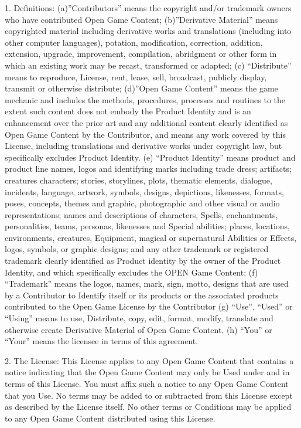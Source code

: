 \documentclass[letter,10pt,twocolumn,openany]{dndbook}
\begin{document}
1. Definitions: (a)”Contributors” means the copyright and/or trademark owners who have contributed Open Game Content; (b)”Derivative Material” means copyrighted material including derivative works and translations (including into other computer languages), potation, modification, correction, addition, extension, upgrade, improvement, compilation, abridgment or other form in which an existing work may be recast, transformed or adapted; (c) “Distribute” means to reproduce, License, rent, lease, sell, broadcast, publicly display, transmit or otherwise distribute; (d)”Open Game Content” means the game mechanic and includes the methods, procedures, processes and routines to the extent such content does not embody the Product Identity and is an enhancement over the prior art and any additional content clearly identified as Open Game Content by the Contributor, and means any work covered by this License, including translations and derivative works under copyright law, but specifically excludes Product Identity. (e) “Product Identity” means product and product line names, logos and identifying marks including trade dress; artifacts; creatures characters; stories, storylines, plots, thematic elements, dialogue, incidents, language, artwork, symbols, designs, depictions, likenesses, formats, poses, concepts, themes and graphic, photographic and other visual or audio representations; names and descriptions of characters, Spells, enchantments, personalities, teams, personas, likenesses and Special abilities; places, locations, environments, creatures, Equipment, magical or supernatural Abilities or Effects, logos, symbols, or graphic designs; and any other trademark or registered trademark clearly identified as Product identity by the owner of the Product Identity, and which specifically excludes the OPEN Game Content; (f) “Trademark” means the logos, names, mark, sign, motto, designs that are used by a Contributor to Identify itself or its products or the associated products contributed to the Open Game License by the Contributor (g) “Use”, “Used” or “Using” means to use, Distribute, copy, edit, format, modify, translate and otherwise create Derivative Material of Open Game Content. (h) “You” or “Your” means the licensee in terms of this agreement.

2. The License: This License applies to any Open Game Content that contains a notice indicating that the Open Game Content may only be Used under and in terms of this License. You must affix such a notice to any Open Game Content that you Use. No terms may be added to or subtracted from this License except as described by the License itself. No other terms or Conditions may be applied to any Open Game Content distributed using this License.
\end{document}
